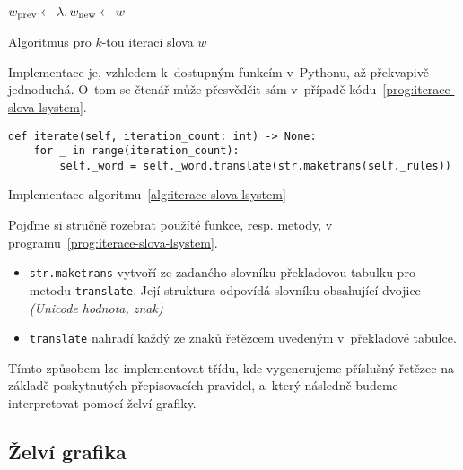 \begin{algorithm}[h]
    $w_{\textup{prev}}\gets\lambda,w_{\textup{new}}\gets w$\;
    \;
    \caption{Algoritmus pro $k$-tou iteraci slova $w$}
    \label{alg:iterace-slova-lsystem}
\end{algorithm}
Implementace je, vzhledem k~dostupným funkcím v~Pythonu, až překvapivě jednoduchá. O~tom se čtenář může přesvědčit sám v~případě kódu~\ref{prog:iterace-slova-lsystem}.
\begin{program}[h]
\begin{lstlisting}[style=python]
def iterate(self, iteration_count: int) -> None:
    for _ in range(iteration_count):
        self._word = self._word.translate(str.maketrans(self._rules))
\end{lstlisting}
    \caption{Implementace algoritmu~\ref{alg:iterace-slova-lsystem}}
    \label{prog:iterace-slova-lsystem}
\end{program}
Pojďme si stručně rozebrat použíté funkce, resp. metody, v programu~\ref{prog:iterace-slova-lsystem}.
\begin{itemize}
    \item \texttt{str.maketrans} vytvoří ze zadaného slovníku překladovou tabulku pro metodu \texttt{translate}. Její struktura odpovídá slovníku obsahující dvojice \emph{(Unicode hodnota, znak)}
    \item \texttt{translate} nahradí každý ze znaků řetězcem uvedeným v~překladové tabulce.
\end{itemize}
Tímto způsobem lze implementovat třídu, kde vygenerujeme příslušný řetězec na základě poskytnutých přepisovacích pravidel, a~který následně budeme interpretovat pomocí želví grafiky.

\subsection{Želví grafika}\label{subsec:implementace-zelvi-grafiky}

